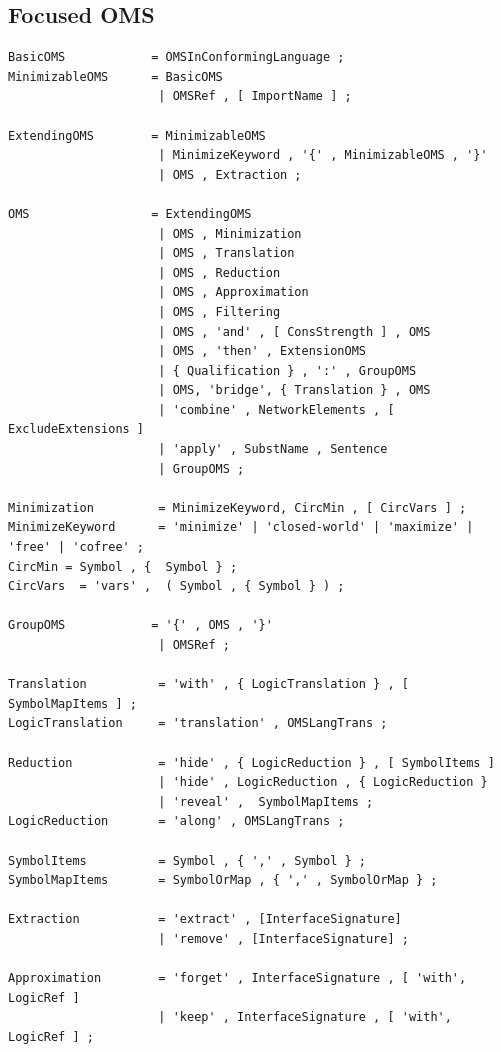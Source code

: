 \documentclass[10pt,%
\ifpretendfinal
final%
\else
draft%
\fi,
]{scrreprt}
\newcommand{\ssclause}[1]{\subsection{#1}}
\begin{document}
\ssclause{Focused OMS}\label{a:dol-text:OMS}


\begin{lstlisting}[language=ebnf,escapeinside={<>},mathescape]
BasicOMS            = OMSInConformingLanguage ;
MinimizableOMS      = BasicOMS
                     | OMSRef , [ ImportName ] ; 
                     
ExtendingOMS        = MinimizableOMS
                     | MinimizeKeyword , '{' , MinimizableOMS , '}' 
                     | OMS , Extraction ;
                     
OMS                 = ExtendingOMS
                     | OMS , Minimization 
                     | OMS , Translation
                     | OMS , Reduction
                     | OMS , Approximation
                     | OMS , Filtering
                     | OMS , 'and' , [ ConsStrength ] , OMS 
                     | OMS , 'then' , ExtensionOMS
                     | { Qualification } , ':' , GroupOMS
                     | OMS, 'bridge', { Translation } , OMS 
                     | 'combine' , NetworkElements , [ ExcludeExtensions ]  
                     | 'apply' , SubstName , Sentence 
                     | GroupOMS ;

Minimization         = MinimizeKeyword, CircMin , [ CircVars ] ;
MinimizeKeyword      = 'minimize' | 'closed-world' | 'maximize' | 'free' | 'cofree' ;
CircMin = Symbol , {  Symbol } ;
CircVars  = 'vars' ,  ( Symbol , { Symbol } ) ;

GroupOMS            = '{' , OMS , '}'
                     | OMSRef ;

Translation          = 'with' , { LogicTranslation } , [ SymbolMapItems ] ;
LogicTranslation     = 'translation' , OMSLangTrans ;
                      
Reduction            = 'hide' , { LogicReduction } , [ SymbolItems ]
                     | 'hide' , LogicReduction , { LogicReduction } 
                     | 'reveal' ,  SymbolMapItems ;
LogicReduction       = 'along' , OMSLangTrans ;

SymbolItems          = Symbol , { ',' , Symbol } ;
SymbolMapItems       = SymbolOrMap , { ',' , SymbolOrMap } ;

Extraction           = 'extract' , [InterfaceSignature]
                     | 'remove' , [InterfaceSignature] ;

Approximation        = 'forget' , InterfaceSignature , [ 'with', LogicRef ] 
                     | 'keep' , InterfaceSignature , [ 'with', LogicRef ] ;


\end{lstlisting}
\end{document}
